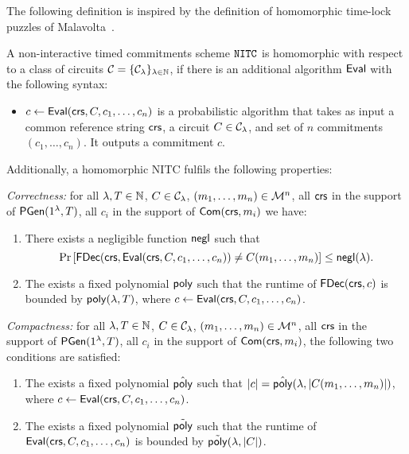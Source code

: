 The following definition is inspired by the definition of homomorphic time-lock puzzles of Malavolta~\etal \cite{C:MalThy19}. 

\begin{definition}
\label{def:nitc_hom}
A non-interactive timed commitments scheme $\mathtt{NITC}$ is homomorphic with respect to a class of circuits $\mathcal{C} = \{\mathcal{C}_{\lambda}\}_{\lambda \in \mathbb{N}}$, if there is an additional algorithm $\mathsf{Eval}$ with the following syntax:
\begin{itemize}
\item $c \leftarrow \mathsf{Eval}(\mathsf{crs}, C, c_1, \dots, c_n)$ is a probabilistic algorithm that takes as input a common reference string $\mathsf{crs}$, a circuit $C \in \mathcal{C}_{\lambda}$, and set of $n$ commitments $(c_1, \dots, c_n)$. It outputs a commitment $c$. 
\end{itemize}
Additionally, a homomorphic NITC fulfils the following properties:
\item \emph{Correctness:} for all $\lambda, T \in \mathbb{N}$, $C \in \mathcal{C}_{\lambda}$, $(m_1, \dots, m_n) \in \mathcal{M}^n$, all $\mathsf{crs}$ in the support of $\mathsf{PGen}(1{^{\lambda}}, T)$, all $c_i$ in the support of $\mathsf{Com}(\mathsf{crs}, m_i)$ we have:
\begin{enumerate}
\item There exists a negligible function $\mathsf{negl}$ such that 
\[\Pr\left[\mathsf{FDec}(\mathsf{crs}, \mathsf{Eval}(\mathsf{crs}, C, c_1, \dots, c_n)) \neq C(m_1, \dots, m_n) \right] \leq \mathsf{negl}(\lambda).
\]
\item The exists a fixed polynomial $\mathsf{poly}$ such that the runtime of $\mathsf{FDec}(\mathsf{crs}, c)$ is bounded by $\mathsf{poly}(\lambda, T)$, where $c \leftarrow \mathsf{Eval}(\mathsf{crs}, C, c_1, \dots, c_n)$.
\end{enumerate}
\item \emph{Compactness:} for all $\lambda, T \in \mathbb{N}$, $C \in \mathcal{C}_{\lambda}$, $(m_1, \dots, m_n) \in \mathcal{M}^n$, all $\mathsf{crs}$ in the support of $\mathsf{PGen}(1{^{\lambda}}, T)$, all $c_i$ in the support of $\mathsf{Com}(\mathsf{crs}, m_i)$, the following two conditions are satisfied:
\begin{enumerate}
\item The exists a fixed polynomial $\hat{\mathsf{poly}}$ such that $|c|=\hat{\mathsf{poly}}(\lambda, |C(m_1, \dots, m_n)|)$, where $c \leftarrow \mathsf{Eval}(\mathsf{crs}, C, c_1, \dots, c_n)$.
\item The exists a fixed polynomial $\tilde{\mathsf{poly}}$ such that the runtime of $\mathsf{Eval}(\mathsf{crs}, C, c_1, \dots, c_n)$ is bounded by $\tilde{\mathsf{poly}}(\lambda, |C|)$.
\end{enumerate}
\end{definition}


